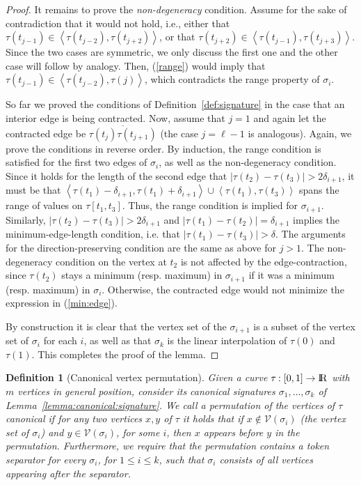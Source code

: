 \documentclass[11pt, letter]{article}
\newtheorem{definition}[theorem]{Definition}
\newcommand{\lemref}[1]{Lemma~\ref{lemma:#1}}
\newcommand{\deflab}[1]{\label{def:#1}}
\newcommand{\defref}[1]{Definition~\ref{def:#1}}
\providecommand{\pth}[2][\!]{#1\left({#2}\right)}
\providecommand{\cbrc}[1]{\left\langle{#1}\right\rangle}
\renewcommand{\Re}{{\rm I\!\hspace{-0.025em} R}}
\newcommand{\lenClusters}{\ensuremath{\ell}}
\newcommand{\trajectory}[2]{\ensuremath{{#1}_{#2}}}
\newcommand{\inputSym}{\ensuremath{\tau}}
\newcommand{\inputTraj}[1]{\trajectory{\inputSym}{#1}}
\newcommand{\VtxSet}{\ensuremath{\mathcal{V}}}
\begin{document}
\begin{proof}
It remains to prove the \emph{non-degeneracy} condition. Assume for the sake of contradiction that it would not hold, i.e., either that $\tau(t_{j-1})\in \cbrc{\tau(t_{j-2}), \tau(t_{j+2})}$, or that  $\tau(t_{j+2})\in \cbrc{\tau(t_{j-1}), \tau(t_{j+3})}$. Since the two cases are symmetric, we only discuss the first one and the other case will follow by analogy. Then, (\ref{range}) would imply that $\tau(t_{j-1}) \in \cbrc{\tau(t_{j-2}),\tau(j)}$, which contradicts the range property of $\sigma_i$.

So far we proved the conditions of \defref{signature} in the case that an interior edge is being contracted.  Now, assume that $j=1$ and again let the contracted edge be $\overline{\tau(t_j)\tau(t_{j+1})}$ (the case $j=\lenClusters-1$ is analogous). Again, we prove the conditions in reverse order.  By induction, the range condition is satisfied for the first two edges of $\sigma_i$, as well as the non-degeneracy condition.  Since it holds for the length of the second edge that $|\tau(t_2)-\tau(t_3)| > 2\delta_{i+1}$, it must be that $\cbrc{\tau(t_1)-\delta_{i+1}, \tau(t_1)+\delta_{i+1}} \cup \cbrc{\tau(t_1),\tau(t_3)}$ spans the range of values  on $\tau[t_1,t_3]$. Thus, the range condition is implied for $\sigma_{i+1}$. Similarly, $|\tau(t_2)-\tau(t_3)| > 2\delta_{i+1}$ and $|\tau(t_1)-\tau(t_2)|=\delta_{i+1}$ implies the minimum-edge-length condition, i.e. that  $|\tau(t_1)-\tau(t_3)|>\delta$. The arguments for the direction-preserving condition are the same as above for $j>1$. The non-degeneracy condition on the vertex at $t_2$ is not affected by the edge-contraction, since $\tau(t_2)$ stays a minimum (resp. maximum) in $\sigma_{i+1}$ if it was a minimum (resp. maximum) in $\sigma_{i}$. Otherwise, the contracted edge would not minimize the expression in (\ref{min:edge}).

By construction it is clear that the vertex set of the  $\sigma_{i+1}$ is a subset of the vertex set of $\sigma_{i}$ for each $i$, as well as that $\sigma_k$ is the linear interpolation of $\tau(0)$ and $\tau(1)$. This completes the proof of the lemma.  
\end{proof}

\begin{definition}[Canonical vertex permutation]
\deflab{vtx:permutation}
Given a curve $\inputTraj{}:[0,1]\rightarrow\Re$ with $m$ vertices in general position, consider its canonical signatures $\sigma_1,\dots,\sigma_k$ of \lemref{canonical:signature}. We call a permutation of the vertices of $\inputTraj{}$ canonical if for any two vertices $x,y$ of $\tau$ it holds that if $x \notin \VtxSet\pth{\sigma_{i}}$ (the vertex set of $\sigma_{i}$) and $y\in \VtxSet\pth{\sigma_{i}}$, for some $i$, then $x$ appears before $y$ in the permutation. Furthermore, we require that the permutation contains a token separator for every $\sigma_i$, for $1\leq i \leq k$, such that $\sigma_i$ consists of all vertices appearing after the separator.
\end{definition}
\end{document}
